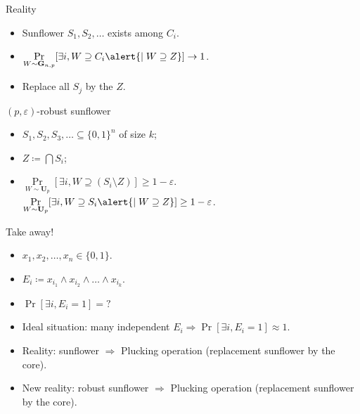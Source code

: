 \begin{frame}{Reality}

    \begin{center}
                
    \end{center}

    \begin{itemize}
        \item Sunflower $S_1, S_2, \dots$ exists among $C_i$.
            \pause
        \item $\Pr\limits_{W \sim \mathbf{G}_{n, p}}[\exists i, W \supseteq C_i \alert{\mid W \supseteq Z}] \to
            1$.
            \pause
        \item Replace all $S_j$ by the $Z$.
    \end{itemize}


    \pause
    \vspace{0.3cm}

    \begin{block}{$(p, \varepsilon)$-robust sunflower}
        \begin{itemize}
            \item $S_1, S_2, S_3, \dots \subseteq \{0, 1\}^n$ of size $k$;
            \item $Z \coloneqq \bigcap S_i$;
            \item $\Pr\limits_{W \sim \mathbf{U}_p}[\exists i, W \supseteq (S_i \setminus Z)] \ge 1 -
                \varepsilon$. \pause
                $\Pr\limits_{W \sim \mathbf{U}_p}[\exists i, W \supseteq S_i \alert{\mid W \supseteq Z}]
                \ge 1 - \varepsilon$. 
        \end{itemize}
    \end{block}

\end{frame}


\begin{frame}{Take away!}

    \begin{itemize}
        \item $x_1, x_2, \dots, x_n \in \{0, 1\}$.
        \item $E_i \coloneqq x_{i_1} \land x_{i_2} \land \dots \land x_{i_k}$.
        \item $\Pr[\exists i, E_i = 1] = ?$
            \pause
        \item Ideal situation: many independent $E_i \Rightarrow \Pr[\exists i, E_i = 1] \approx 1$.
            \pause
        \item Reality: sunflower $\Rightarrow$ Plucking operation (replacement sunflower by the core).
            \pause
        \item New reality: robust sunflower $\Rightarrow$ Plucking operation (replacement sunflower by
            the core).
    \end{itemize}
    
\end{frame}